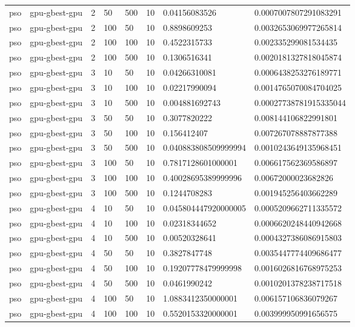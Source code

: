 \begin{table}[t]
\begin{tabular}{llllllll}
pso & gpu-gbest-gpu & 2 & 50 & 500 & 10 & 0.04156083526 & 0.0007007807291083291 \\
pso & gpu-gbest-gpu & 2 & 100 & 50 & 10 & 0.8898609253 & 0.0032653069977265814 \\
pso & gpu-gbest-gpu & 2 & 100 & 100 & 10 & 0.4522315733 & 0.002335299081534435 \\
pso & gpu-gbest-gpu & 2 & 100 & 500 & 10 & 0.1306516341 & 0.0020181327818045874 \\
pso & gpu-gbest-gpu & 3 & 10 & 50 & 10 & 0.04266310081 & 0.0006438253276189771 \\
pso & gpu-gbest-gpu & 3 & 10 & 100 & 10 & 0.02217990094 & 0.0014765070084704025 \\
pso & gpu-gbest-gpu & 3 & 10 & 500 & 10 & 0.004881692743 & 0.00027738781915335044 \\
pso & gpu-gbest-gpu & 3 & 50 & 50 & 10 & 0.3077820222 & 0.008144106822991801 \\
pso & gpu-gbest-gpu & 3 & 50 & 100 & 10 & 0.156412407 & 0.007267078887877388 \\
pso & gpu-gbest-gpu & 3 & 50 & 500 & 10 & 0.040883808509999994 & 0.0010243649135968451 \\
pso & gpu-gbest-gpu & 3 & 100 & 50 & 10 & 0.7817128601000001 & 0.006617562369586897 \\
pso & gpu-gbest-gpu & 3 & 100 & 100 & 10 & 0.40028695389999996 & 0.00672000023682826 \\
pso & gpu-gbest-gpu & 3 & 100 & 500 & 10 & 0.1244708283 & 0.001945256403662289 \\
pso & gpu-gbest-gpu & 4 & 10 & 50 & 10 & 0.045804447920000005 & 0.0005209662711335572 \\
pso & gpu-gbest-gpu & 4 & 10 & 100 & 10 & 0.02318344652 & 0.0006620248440942668 \\
pso & gpu-gbest-gpu & 4 & 10 & 500 & 10 & 0.00520328641 & 0.0004327386086915803 \\
pso & gpu-gbest-gpu & 4 & 50 & 50 & 10 & 0.3827847748 & 0.0035447774409686477 \\
pso & gpu-gbest-gpu & 4 & 50 & 100 & 10 & 0.19207778479999998 & 0.0016026816768975253 \\
pso & gpu-gbest-gpu & 4 & 50 & 500 & 10 & 0.0461990242 & 0.0010201378238717518 \\
pso & gpu-gbest-gpu & 4 & 100 & 50 & 10 & 1.0883412350000001 & 0.006157106836079267 \\
pso & gpu-gbest-gpu & 4 & 100 & 100 & 10 & 0.5520153320000001 & 0.003999950991656575 \\

\end{tabular}
\end{table}
